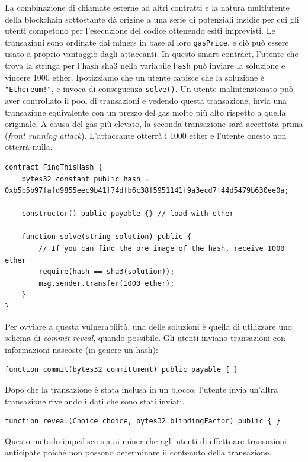 La combinazione di chiamate esterne ad altri contratti e la natura multiutente della blockchain sottostante dà origine a una serie di potenziali insidie per cui gli utenti competono per l'esecuzione del codice ottenendo esiti imprevisti. Le transazioni sono ordinate dai miners in base al loro \texttt{gasPrice}, e ciò può essere usato a proprio vantaggio dagli attaccanti. In questo smart contract, l'utente che trova la stringa per l'hash sha3 nella variabile \texttt{hash} può inviare la soluzione e vincere 1000 ether. Ipotizziamo che un utente capisce che la soluzione è \texttt{"Ethereum!"}, e invoca di conseguenza \texttt{solve()}. Un utente malintenzionato può aver controllato il pool di transazioni e vedendo questa transazione, invia una transazione equivalente con un prezzo del gas molto più alto rispetto a quella originale. A causa del gas più elevato, la seconda transazione sarà accettata prima (\textit{front running attack}). L'attaccante otterrà i 1000 ether e l'utente onesto non otterrà nulla.
\begin{lstlisting}[language=Solidity]
contract FindThisHash {
    bytes32 constant public hash = 0xb5b5b97fafd9855eec9b41f74dfb6c38f5951141f9a3ecd7f44d5479b630ee0a;
    
    constructor() public payable {} // load with ether
    
    function solve(string solution) public {
        // If you can find the pre image of the hash, receive 1000 ether
        require(hash == sha3(solution)); 
        msg.sender.transfer(1000 ether);
    }
}
\end{lstlisting}
Per ovviare a questa vulnerabilità, una delle soluzioni è quella di utilizzare uno schema di \textit{commit-reveal}, quando possibile. Gli utenti inviano transazioni con informazioni nascoste (in genere un hash):
\begin{lstlisting}[language=Solidity]
function commit(bytes32 committment) public payable { }
\end{lstlisting}
Dopo che la transazione è stata inclusa in un blocco, l'utente invia un'altra transazione rivelando i dati che sono stati inviati.
\begin{lstlisting}[language=Solidity]
function reveal(Choice choice, bytes32 blindingFactor) public { }
\end{lstlisting}
Questo metodo impedisce sia ai miner che agli utenti di effettuare transazioni anticipate poiché non possono determinare il contenuto della transazione.

